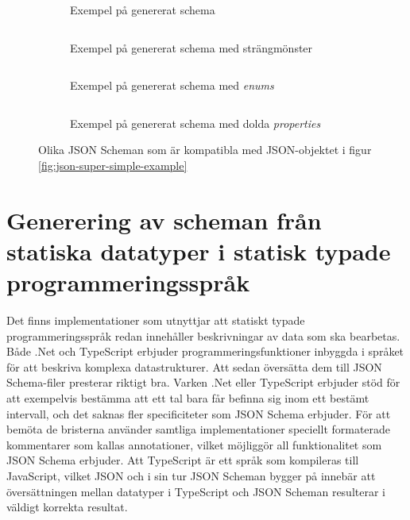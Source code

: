 \begin{figure}
	\begin{subfigure}[t]{0.47\textwidth}
		\inputminted[tabsize=2, frame=single, fontsize=\small, framesep=2mm]{json}{code/schema-generation-example/schema-example1.json}
		\vspace{-1.2em}
		\caption{Exempel på genererat schema}
		\label{fig:schema-super-simple-example-1}
	\end{subfigure}\hfill
	\begin{subfigure}[t]{0.47\textwidth}
		\inputminted[tabsize=2, frame=single, fontsize=\small, framesep=2mm]{json}{code/schema-generation-example/schema-example2.json}
		\vspace{-1.2em}
		\caption{Exempel på genererat schema med strängmönster}
		\label{fig:schema-super-simple-example-2}
		\vspace{.8em}
	\end{subfigure}
	\begin{subfigure}[t]{0.47\textwidth}
		\inputminted[tabsize=2, frame=single, fontsize=\small, framesep=2mm]{json}{code/schema-generation-example/schema-example3.json}
		\vspace{-1.2em}
		\caption{Exempel på genererat schema med \textit{enums}}
		\label{fig:schema-super-simple-example-3}
	\end{subfigure}\hfill
	\begin{subfigure}[t]{0.47\textwidth}
		\inputminted[tabsize=2, frame=single, fontsize=\small, framesep=2mm]{json}{code/schema-generation-example/schema-example4.json}
		\vspace{-1.2em}
		\caption{Exempel på genererat schema med dolda \textit{properties}}
		\label{fig:schema-super-simple-example-4}
	\end{subfigure}
	\caption{Olika JSON Scheman som är kompatibla med JSON-objektet i figur \ref{fig:json-super-simple-example}}
	\label{fig:schema-super-simple-example-group}
\end{figure}



\section{Generering av scheman från statiska datatyper i statisk typade programmeringsspråk}
Det finns implementationer som utnyttjar att statiskt typade programmeringsspråk redan innehåller beskrivningar av data som ska bearbetas. Både .Net och TypeScript erbjuder programmeringsfunktioner inbyggda i språket för att beskriva komplexa datastrukturer. Att sedan översätta dem till JSON Schema-filer presterar riktigt bra. Varken .Net eller TypeScript erbjuder stöd för att exempelvis bestämma att ett tal bara får befinna sig inom ett bestämt intervall, och det saknas fler specificiteter som JSON Schema erbjuder. För att bemöta de bristerna använder samtliga implementationer speciellt formaterade kommentarer som kallas annotationer, vilket möjliggör all funktionalitet som JSON Schema erbjuder. Att TypeScript är ett språk som kompileras till JavaScript, vilket JSON och i sin tur JSON Scheman bygger på innebär att översättningen mellan datatyper i TypeScript och JSON Scheman resulterar i väldigt korrekta resultat. \cite{Newtonsoft,Suter,El-Dardiry,Bovet}

